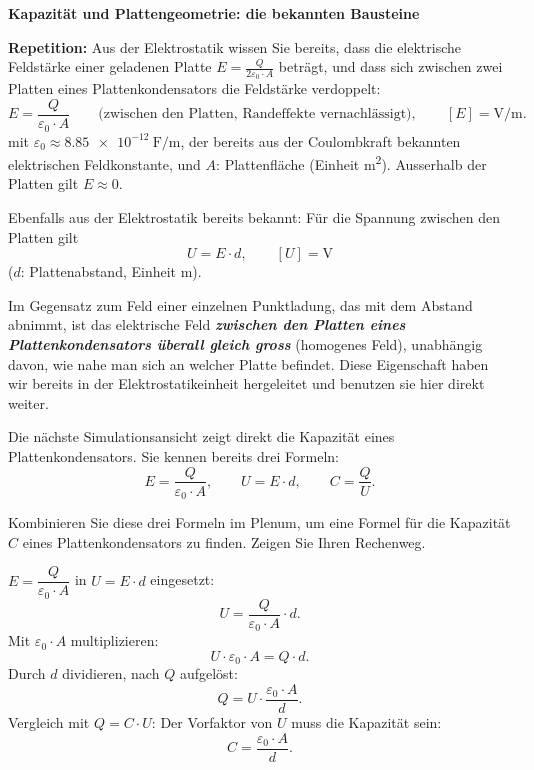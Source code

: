 \documentclass[addpoints,11pt,a4paper]{exam}
\newenvironment{theoriebox}[1][Theorie]{%
  \par\addvspace{10pt}\noindent\textbf{#1}\par\smallskip\noindent
}{%
  \par\addvspace{10pt}
}
\newlength{\antwortraumlen}
\newcommand{\Antwortraum}[1]{%
  \pgfmathsetlength{\antwortraumlen}{#1*2.5cm}%
  \begin{answerbox}
    \rule{0pt}{\antwortraumlen}%
  \end{answerbox}%
}
\begin{document}
\begin{theoriebox}[Kapazität und Plattengeometrie: die bekannten Bausteine]
\textbf{Repetition:} Aus der Elektrostatik wissen Sie bereits, dass die
elektrische Feldstärke einer geladenen Platte
$E=\frac{Q}{2\varepsilon_0\cdot A}$ beträgt, und dass sich zwischen zwei
Platten eines Plattenkondensators die Feldstärke verdoppelt:
\[
  \boxed{E = \frac{Q}{\varepsilon_0\cdot A}} \qquad \text{(zwischen den Platten, Randeffekte vernachlässigt)},
  \qquad [E] = \si{\volt\per\meter}.
\]
mit $\varepsilon_0\approx\SI{8.85e-12}{\farad\per\meter}$, der bereits aus
der Coulombkraft bekannten elektrischen Feldkonstante, und $A$: Plattenfläche
(Einheit \si{\meter\squared}). Ausserhalb der Platten gilt $E\approx0$.

Ebenfalls aus der Elektrostatik bereits bekannt: Für die Spannung zwischen
den Platten gilt
\[
  \boxed{U = E\cdot d}, \qquad [U] = \si{\volt}
\]
($d$: Plattenabstand, Einheit \si{\meter}).

\begin{hinweisbox}
Im Gegensatz zum Feld einer einzelnen Punktladung, das mit dem Abstand
abnimmt, ist das elektrische Feld \textbf{\emph{zwischen den Platten eines
Plattenkondensators überall gleich gross}} (homogenes Feld), unabhängig
davon, wie nahe man sich an welcher Platte befindet. Diese Eigenschaft
haben wir bereits in der Elektrostatikeinheit hergeleitet und benutzen sie
hier direkt weiter.
\end{hinweisbox}
\end{theoriebox}

\begin{questions}
\begin{groupbox}
Die nächste Simulationsansicht zeigt direkt die Kapazität eines
Plattenkondensators. Sie kennen bereits drei Formeln:
\[
  E = \frac{Q}{\varepsilon_0\cdot A}, \qquad U = E\cdot d, \qquad C = \frac{Q}{U}.
\]

\needspace{12cm}
\question[4] Kombinieren Sie diese drei Formeln im Plenum, um eine Formel
für die Kapazität $C$ eines Plattenkondensators zu finden. Zeigen Sie
Ihren Rechenweg.
\Antwortraum{4}
\begin{solution}
$E=\dfrac{Q}{\varepsilon_0\cdot A}$ in $U=E\cdot d$ eingesetzt:
\[
  U = \frac{Q}{\varepsilon_0\cdot A}\cdot d.
\]
Mit $\varepsilon_0\cdot A$ multiplizieren:
\[
  U\cdot\varepsilon_0\cdot A = Q\cdot d.
\]
Durch $d$ dividieren, nach $Q$ aufgelöst:
\[
  Q = U\cdot\frac{\varepsilon_0\cdot A}{d}.
\]
Vergleich mit $Q=C\cdot U$: Der Vorfaktor von $U$ muss die Kapazität sein:
\[
  \boxed{C = \frac{\varepsilon_0\cdot A}{d}}.
\]
\end{solution}
\end{groupbox}
\end{questions}
\end{document}

